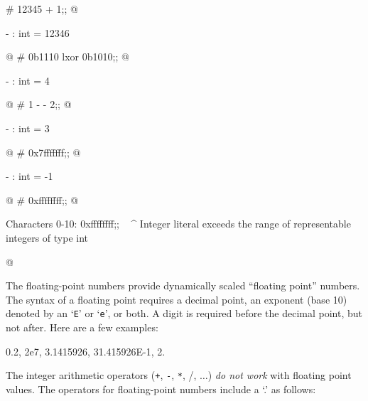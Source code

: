 \begin{ocaml}
# 12345 + 1;;
@
\begin{topoutput}
- : int = 12346
\end{topoutput}
@
# 0b1110 lxor 0b1010;;
@
\begin{topoutput}
- : int = 4
\end{topoutput}
@
# 1 - - 2;;
@
\begin{topoutput}
- : int = 3
\end{topoutput}
@
# 0x7fffffff;;
@
\begin{topoutput}
- : int = -1
\end{topoutput}
@
# 0xffffffff;;
@
\begin{toperror}
Characters 0-10:
  0xffffffff;;
  ^^^^^^^^^^
Integer literal exceeds the range of representable integers of type int
\end{toperror}
@
\end{ocaml}

\label{literal:float}
The floating-point numbers provide dynamically scaled ``floating
point'' numbers.  The syntax of a floating point requires a decimal
point, an exponent (base 10) denoted by an `\hbox{\lstinline/E/}' or
`\hbox{\lstinline/e/}', or both.  A digit is required before the
decimal point, but not after.  Here are a few examples:

\begin{center}
0.2, 2e7, 3.1415926, 31.415926E-1, 2.
\end{center}
%
The integer arithmetic operators (\hbox{\lstinline/+/}, \hbox{\lstinline/-/}, \hbox{\lstinline/*/},
\hbox{\lstinline//}/, $\ldots$) \emph{do not work} with floating point values.
The operators for floating-point numbers include a `.' as follows:

